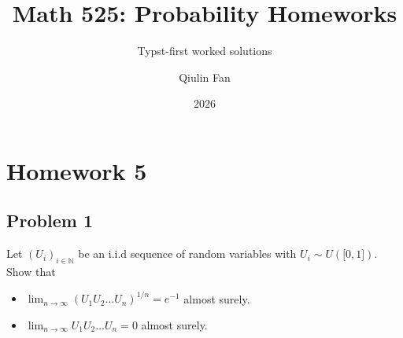 \documentclass{qlnotes-export}
\title{Math 525: Probability Homeworks}
\subtitle{Typst-first worked solutions}
\author{Qiulin Fan}
\date{2026}
\begin{document}
\mainmatter
\chapter{Homework 5}\label{homework-5}

\section{Problem 1}\label{problem-1-5}

Let \(\left( U_{i} \right)_{i \in {\mathbb{N}}}\) be an i.i.d sequence of random variables with \(U_{i} \sim U(\lbrack 0,1\rbrack)\). Show that

\begin{itemize}
\item
  \(\lim_{n\rightarrow\infty}\left( {U_{1}U_{2}\ldots U_{n}} \right)^{1/n} = e^{- 1}\) almost surely.
\item
  \(\lim_{n\rightarrow\infty}U_{1}U_{2}\ldots U_{n} = 0\) almost surely.
\end{itemize}
\end{document}
